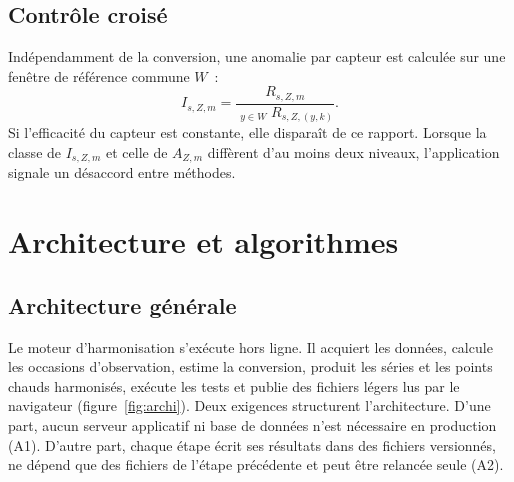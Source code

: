 \documentclass[11pt,a4paper]{article}
\DeclareMathOperator{\med}{m\acute{e}d}
\begin{document}
\subsection{Contrôle croisé}

Indépendamment de la conversion, une anomalie par capteur est calculée sur une fenêtre de référence commune $W$~:
\begin{equation}
  I_{s,Z,m} = \frac{R_{s,Z,m}}{\med_{y\in W} R_{s,Z,(y,k)}}.
\end{equation}
Si l'efficacité du capteur est constante, elle disparaît de ce rapport. Lorsque la classe de $I_{s,Z,m}$ et celle de $A_{Z,m}$ diffèrent d'au moins deux niveaux, l'application signale un désaccord entre méthodes.

\section{Architecture et algorithmes}\label{sec:archi}

\subsection{Architecture générale}

Le moteur d'harmonisation s'exécute hors ligne. Il acquiert les données, calcule les occasions d'observation, estime la conversion, produit les séries et les points chauds harmonisés, exécute les tests et publie des fichiers légers lus par le navigateur (figure~\ref{fig:archi}). Deux exigences structurent l'architecture. D'une part, aucun serveur applicatif ni base de données n'est nécessaire en production (A1). D'autre part, chaque étape écrit ses résultats dans des fichiers versionnés, ne dépend que des fichiers de l'étape précédente et peut être relancée seule (A2).
\end{document}
